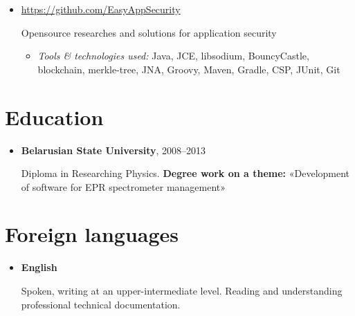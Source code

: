 \documentclass[a4paper, 12pt]{article}
\newcommand{\position}[1]{
    \textbf{#1}}
\newcommand{\itemlabel}[1]{
    \textit{#1:}}
\begin{document}
	\begin{itemize}
        \item \href{https://github.com/EasyAppSecurity}{https://github.com/EasyAppSecurity}

Opensource researches and solutions for application security

            \begin{itemize}
                \item \itemlabel{Tools \& technologies used} Java, JCE, libsodium, BouncyCastle, blockchain, merkle-tree, JNA, Groovy, Maven, Gradle, CSP, JUnit, Git
            \end{itemize}
    \end{itemize}   

\section*{Education}

    \begin{itemize}

        \item \position{Belarusian State University}, 2008--2013

            Diploma in Researching Physics.
            \newline\textbf{Degree work on a theme:} 
            \newline «Development of software for EPR spectrometer management»
    \end{itemize}
    
\section*{Foreign languages}
 	\begin{itemize}
 		 \item \position{English}
 		 
 		 Spoken, writing at an upper-intermediate level. Reading and understanding professional technical documentation.  
 	\end{itemize}    
    
\end{document}
